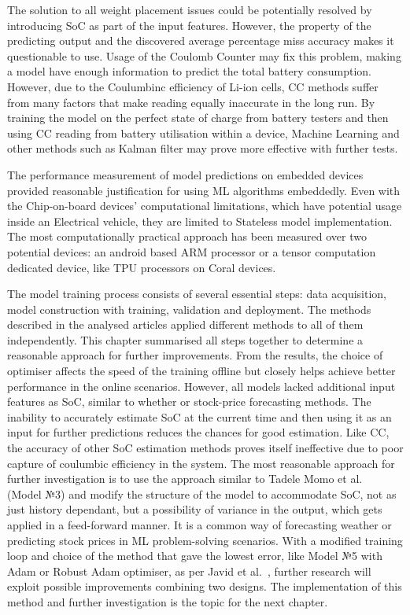 %
%
The solution to all weight placement issues could be potentially resolved by introducing SoC as part of the input features.
However, the property of the predicting output and the discovered average percentage miss accuracy makes it questionable to use.
Usage of the Coulomb Counter may fix this problem, making a model have enough information to predict the total battery consumption.
However, due to the Coulumbinc efficiency of Li-ion cells, CC methods suffer from many factors that make reading equally inaccurate in the long run.
By training the model on the perfect state of charge from battery testers and then using CC reading from battery utilisation within a device, Machine Learning and other methods such as Kalman filter may prove more effective with further tests.

%
%
The performance measurement of model predictions on embedded devices provided reasonable justification for using ML algorithms embeddedly.
Even with the Chip-on-board devices' computational limitations, which have potential usage inside an Electrical vehicle, they are limited to Stateless model implementation.
The most computationally practical approach has been measured over two potential devices: an android based ARM processor or a tensor computation dedicated device, like TPU processors on Coral devices.

%
%
The model training process consists of several essential steps: data acquisition, model construction with training, validation and deployment.
The methods described in the analysed articles applied different methods to all of them independently.
This chapter summarised all steps together to determine a reasonable approach for further improvements.
From the results, the choice of optimiser affects the speed of the training offline but closely helps achieve better performance in the online scenarios.
However, all models lacked additional input features as SoC, similar to whether or stock-price forecasting methods.
The inability to accurately estimate SoC at the current time and then using it as an input for further predictions reduces the chances for good estimation.
Like CC, the accuracy of other SoC estimation methods proves itself ineffective due to poor capture of coulumbic efficiency in the system.
The most reasonable approach for further investigation is to use the approach similar to Tadele Momo et al.~\cite{mamo_long_2020} (Model №3) and modify the structure of the model to accommodate SoC, not as just history dependant, but a possibility of variance in the output, which gets applied in a feed-forward manner. 
It is a common way of forecasting weather or predicting stock prices in ML problem-solving scenarios.
With a modified training loop and choice of the method that gave the lowest error, like Model №5 with Adam or Robust Adam optimiser, as per Javid et al.~\cite{javid_adaptive_2020}, further research will exploit possible improvements combining two designs.
The implementation of this method and further investigation is the topic for the next chapter.
